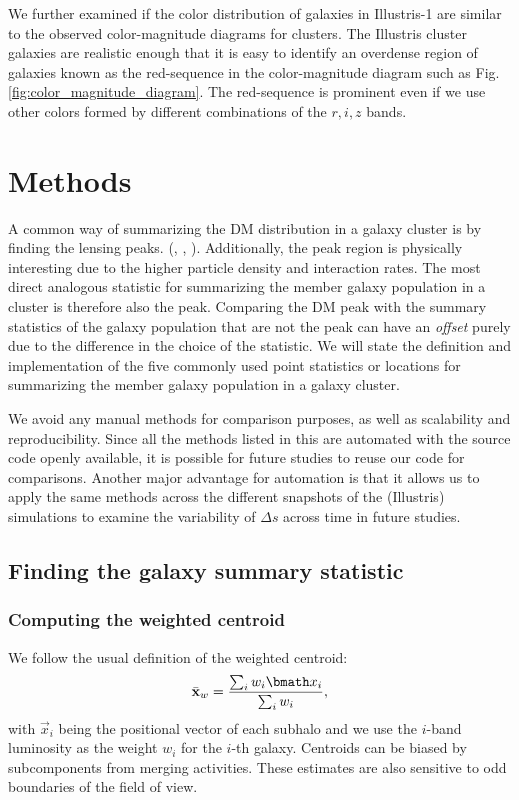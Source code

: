 We further examined if the color distribution of galaxies in Illustris-1 are
similar to the observed color-magnitude diagrams for clusters.
The Illustris cluster galaxies are realistic enough that it is easy to
identify an overdense region of galaxies known as the red-sequence in the 
color-magnitude diagram such as Fig.
\ref{fig:color_magnitude_diagram}. The red-sequence is prominent even if we
use other colors formed by different combinations of the $r, i, z$ bands.

\section{Methods}\label{sec:methods}
A common way of summarizing the DM distribution in a
galaxy cluster is by finding the lensing peaks.
(\citealt{Medezinski2013}, \citealt{Markevitch2004}, 
\citealt{Zitrin13}). 
Additionally, the peak region is physically 
interesting due to the higher particle density and interaction rates. 
The most direct analogous statistic for summarizing the member galaxy
population in a cluster is therefore also the peak. 
Comparing the DM peak with the summary statistics of the galaxy population that
are not the peak  can have an {\it offset} purely due to the difference in
the choice of the statistic. 
We will state the definition and implementation of the five commonly used 
point statistics or locations for summarizing 
the member galaxy population in a galaxy cluster.

We avoid any manual methods for
comparison purposes, as well as scalability and reproducibility. 
Since all the methods listed in this 
are automated with the source code openly available, 
it is possible for future studies to reuse our code for comparisons. 
Another major advantage for automation is that it allows us  
to apply
the same methods across the different snapshots of the (Illustris) simulations to
examine the variability of $\Delta s$ across time in future studies. 


\subsection{Finding the galaxy summary statistic}
\subsubsection{Computing the weighted centroid}
\label{subsubsec:weighted_centroid}
We follow the usual definition of the weighted centroid: 
\begin{equation}
	\bar{\bf x}_w = \frac{\sum_i w_i \vec{x}_i}{\sum_i w_i},
\end{equation}
with $\vec{x}_i$ being the positional vector of each subhalo 
and we use the $i$-band luminosity 
as the weight $w_i$ for the $i$-th galaxy.
Centroids can be biased by subcomponents from merging activities. 
These estimates are also sensitive to odd boundaries 
of the field of view.

